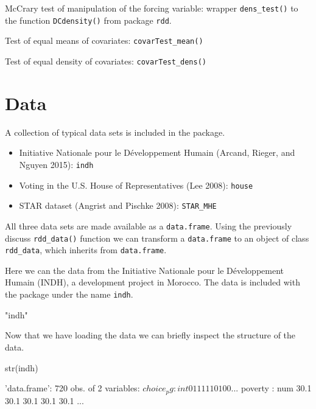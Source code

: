 \documentclass[article]{jss}
\begin{document}
McCrary test of manipulation of the forcing variable: wrapper
\texttt{dens\_test()} to the function \texttt{DCdensity()} from package
\texttt{rdd}.

Test of equal means of covariates: \texttt{covarTest\_mean()}

Test of equal density of covariates: \texttt{covarTest\_dens()}

\section{Data}\label{data}

A collection of typical data sets is included in the package.

\begin{itemize}
\itemsep1pt\parskip0pt
\item
  Initiative Nationale pour le Développement Humain (Arcand, Rieger, and
  Nguyen 2015): \texttt{indh}
\item
  Voting in the U.S. House of Representatives (Lee 2008): \texttt{house}
\item
  STAR dataset (Angrist and Pischke 2008): \texttt{STAR\_MHE}
\end{itemize}

All three data sets are made available as a \texttt{data.frame}. Using
the previously discuss \texttt{rdd\_data()} function we can transform a
\texttt{data.frame} to an object of class \texttt{rdd\_data}, which
inherits from \texttt{data.frame}.

Here we can the data from the Initiative Nationale pour le Développement
Humain (INDH), a development project in Morocco. The data is included
with the package under the name \texttt{indh}.

\begin{CodeChunk}
\begin{CodeOutput}
[1] "indh"
\end{CodeOutput}
\end{CodeChunk}

Now that we have loading the data we can briefly inspect the structure
of the data.

\begin{CodeChunk}
\begin{CodeInput}
str(indh)
\end{CodeInput}
\begin{CodeOutput}
'data.frame':   720 obs. of  2 variables:
 $ choice_pg: int  0 1 1 1 1 1 0 1 0 0 ...
 $ poverty  : num  30.1 30.1 30.1 30.1 30.1 ...
\end{CodeOutput}
\end{CodeChunk}
\end{document}
